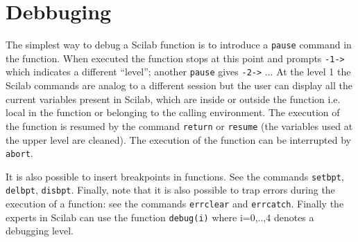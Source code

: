 \section{Debbuging}
The simplest way to debug a Scilab function is to introduce
a {\tt pause} command in the function.
When executed the function stops at this point and prompts {\tt -1->} which 
indicates a different ``level''; another {\tt pause} gives {\tt -2->} ...
At the level 1 the Scilab commands are analog to a different session but
the user can display all the current variables present in Scilab,
which are inside or outside the function i.e. local in the function
or belonging to the calling environment. The execution of the function
is resumed by the command {\tt return} or {\tt resume} (the variables used
at the upper level are cleaned).
The execution of the function can be interrupted by {\tt abort}.

It is also possible to insert breakpoints in functions. See the commands
{\tt setbpt}, {\tt delbpt}, {\tt disbpt}.
Finally, note that it is also possible to trap errors during the 
execution of a function: 
see the commands {\tt errclear} and {\tt errcatch}.
Finally the experts in  Scilab  can use the 
function {\tt debug(i)} where i=0,..,4 denotes a debugging level.
